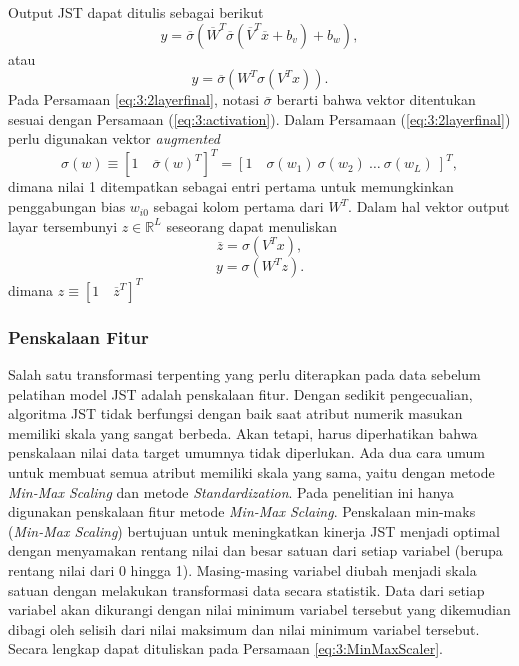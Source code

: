 \noindent Output JST dapat ditulis sebagai berikut
\begin{equation} \label{eq:3:2layer}
y = \overline{\sigma}
\left(
	\overline{W}^T\overline{\sigma}(\overline{V}^T\overline{x}+b_v)+b_w
\right),
\end{equation}
atau
\begin{equation} \label{eq:3:2layerfinal}
y = \overline{\sigma}
\left(
	W^T\sigma(V^Tx)
\right).
\end{equation}
Pada Persamaan \ref{eq:3:2layerfinal}, notasi $\overline{\sigma}$ berarti bahwa vektor ditentukan sesuai dengan Persamaan (\ref{eq:3:activation}). Dalam Persamaan (\ref{eq:3:2layerfinal}) perlu digunakan vektor \textit{augmented}
\begin{equation} \label{eq:3:augVector}
\sigma(w) \equiv [1\quad \overline{\sigma}(w)^T]^T = [1\quad \sigma(w_1)\ \sigma(w_2)\ \dots\ \sigma(w_L)\ ]^T,
\end{equation}
\noindent dimana nilai 1 ditempatkan sebagai entri pertama untuk memungkinkan penggabungan bias $w_{i0}$ sebagai kolom pertama dari $W^T$. Dalam hal vektor output layar tersembunyi $z\in \mathbb{R}^L$ seseorang dapat menuliskan
\begin{equation} \label{eq:3:final19}
\overline{z} = \sigma(V^Tx),
\end{equation}
\begin{equation} \label{eq:3:final20}
y = \sigma(W^Tz).
\end{equation}
\noindent dimana $z \equiv [1\quad \overline{z}^T]^T$

\subsubsection{Penskalaan Fitur}

Salah satu transformasi terpenting yang perlu diterapkan pada data sebelum pelatihan model JST adalah penskalaan fitur. Dengan sedikit pengecualian, algoritma JST tidak berfungsi dengan baik saat atribut numerik masukan memiliki skala yang sangat berbeda. Akan tetapi, harus diperhatikan bahwa penskalaan nilai data target umumnya tidak diperlukan. Ada dua cara umum untuk membuat semua atribut memiliki skala yang sama, yaitu dengan metode \textit{Min-Max Scaling} dan metode \textit{Standardization}\cite{HandsOnML}. Pada penelitian ini hanya digunakan penskalaan fitur metode \textit{Min-Max Sclaing}. Penskalaan min-maks (\textit{Min-Max Scaling}) bertujuan untuk meningkatkan kinerja JST menjadi optimal dengan menyamakan rentang nilai dan besar satuan dari setiap variabel (berupa rentang nilai dari 0 hingga 1). Masing-masing variabel diubah menjadi skala satuan dengan melakukan transformasi data secara statistik. Data dari setiap variabel akan dikurangi dengan nilai minimum variabel tersebut yang dikemudian dibagi oleh selisih dari nilai maksimum dan nilai minimum variabel tersebut. Secara lengkap dapat dituliskan pada Persamaan \ref{eq:3:MinMaxScaler}.

